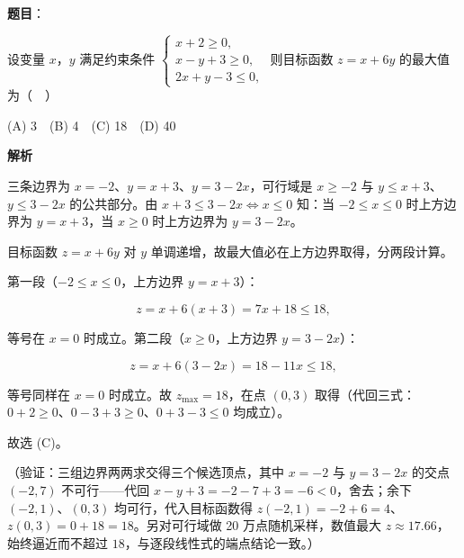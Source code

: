 \begin{answer}

\textbf{题目}：

设变量 \(x\)，\(y\) 满足约束条件 \(\begin{cases}x+2\geqslant0,\\x-y+3\geqslant0,\\2x+y-3\leqslant0,\end{cases}\) 则目标函数 \(z=x+6y\) 的最大值为（　）

(A) 3　(B) 4　(C) 18　(D) 40

\textbf{解析}

三条边界为 \(x=-2\)、\(y=x+3\)、\(y=3-2x\)，可行域是 \(x\geqslant-2\) 与 \(y\leqslant x+3\)、\(y\leqslant 3-2x\) 的公共部分。由 \(x+3\leqslant 3-2x\iff x\leqslant 0\) 知：当 \(-2\leqslant x\leqslant 0\) 时上方边界为 \(y=x+3\)，当 \(x\geqslant 0\) 时上方边界为 \(y=3-2x\)。

目标函数 \(z=x+6y\) 对 \(y\) 单调递增，故最大值必在上方边界取得，分两段计算。

第一段（\(-2\leqslant x\leqslant 0\)，上方边界 \(y=x+3\)）：

\nopagebreak[4]
\[
z=x+6(x+3)=7x+18\leqslant 18,
\]

等号在 \(x=0\) 时成立。第二段（\(x\geqslant 0\)，上方边界 \(y=3-2x\)）：

\nopagebreak[4]
\[
z=x+6(3-2x)=18-11x\leqslant 18,
\]

等号同样在 \(x=0\) 时成立。故 \(z_{\max}=18\)，在点 \((0,3)\) 取得（代回三式：\(0+2\geqslant 0\)、\(0-3+3\geqslant 0\)、\(0+3-3\leqslant 0\) 均成立）。

故选 (C)。

（验证：三组边界两两求交得三个候选顶点，其中 \(x=-2\) 与 \(y=3-2x\) 的交点 \((-2,7)\) 不可行——代回 \(x-y+3=-2-7+3=-6<0\)，舍去；余下 \((-2,1)\)、\((0,3)\) 均可行，代入目标函数得 \(z(-2,1)=-2+6=4\)、\(z(0,3)=0+18=18\)。另对可行域做 20 万点随机采样，数值最大 \(z\approx 17.66\)，始终逼近而不超过 \(18\)，与逐段线性式的端点结论一致。）


\end{answer}
